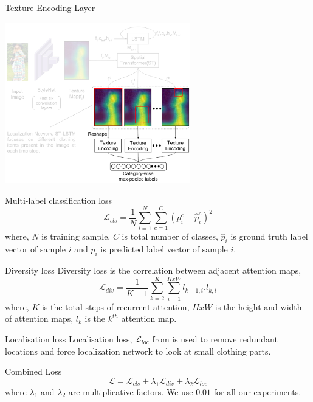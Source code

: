 \documentclass[handout]{beamer}
\begin{document}
\begin{frame}{Texture Encoding Layer}
\vspace{-1cm}
  \begin{center}
    \includegraphics[width=0.8\linewidth, height=7cm]{images/staqu_st_ten_arch_text}
  \end{center}
\end{frame}

\begin{frame}{Multi-label classification loss}
      \begin{equation}
        \mathcal{L}_{cls} = \frac{1}{N} \sum^N_{i=1}\sum^C_{c=1}(p^c_i-\hat{p}^c_i)^2
      \end{equation}
      where, $N$ is training sample, $C$ is total number of classes, $\hat{p}_i$ is ground truth label vector of sample $i$ and $p_i$ is predicted label vector of sample $i$.
\end{frame}

\begin{frame}{Diversity loss}
  Diversity loss is the correlation between adjacent attention maps,
  \begin{equation}
    \mathcal{L}_{div} = \frac{1}{K-1} \sum^K_{k=2}\sum^{HxW}_{i=1} l_{k-1,i}.l_{k,i}
  \end{equation}
  where, $K$ is the total steps of recurrent attention, $HxW$ is the height and width of attention maps, $l_{k}$ is the $k^{th}$ attention map.
\end{frame}

\begin{frame}{Localisation loss}
  Localisation loss, $\mathcal{L}_{loc}$ from \cite{WangSTLSTMICCV2017} is used to remove redundant locations and force localization network to look at small clothing parts.
\end{frame}

\begin{frame}{Combined Loss}
  \begin{equation}
    \mathcal{L} = \mathcal{L}_{cls} + \lambda_1\mathcal{L}_{div} + \lambda_2\mathcal{L}_{loc}
  \end{equation}
  where $\lambda_1$ and $\lambda_2$ are multiplicative factors. We use $0.01$ for all our experiments.
\end{frame}
\end{document}
